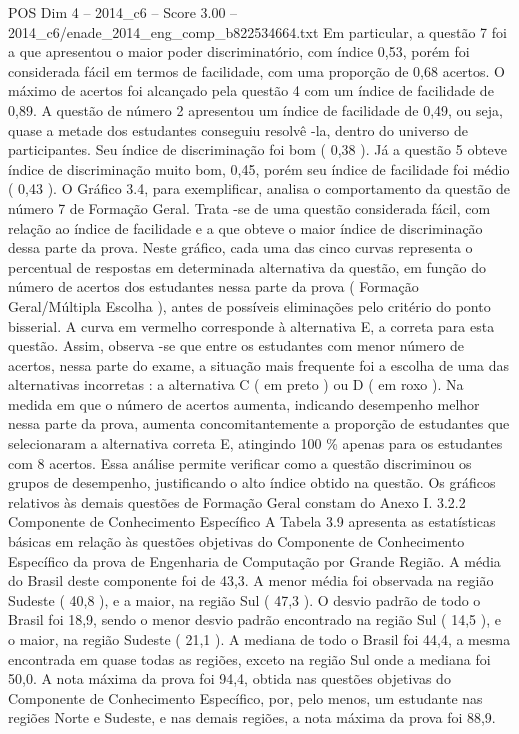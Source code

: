 \begin{textsample}{POS Dim 4 – 2014\_c6 – Score 3.00 – 2014\_c6/enade\_2014\_eng\_comp\_b822534664.txt}
Em particular, a questão 7 foi a que apresentou o maior poder discriminatório, com índice 0,53, porém foi considerada fácil em termos de facilidade, com uma proporção de 0,68 acertos.
O máximo de acertos foi alcançado pela questão 4 com um índice de facilidade de 0,89.
A questão de número 2 apresentou um índice de facilidade de 0,49, ou seja, quase a metade dos estudantes conseguiu resolvê -la, dentro do universo de participantes.
Seu índice de discriminação foi bom ( 0,38 ).
Já a questão 5 obteve índice de discriminação muito bom, 0,45, porém seu índice de facilidade foi médio ( 0,43 ).
O Gráfico 3.4, para exemplificar, analisa o comportamento da questão de número 7 de Formação Geral.
Trata -se de uma questão considerada fácil, com relação ao índice de facilidade e a que obteve o maior índice de discriminação dessa parte da prova.
Neste gráfico, cada uma das cinco curvas representa o percentual de respostas em determinada alternativa da questão, em função do número de acertos dos estudantes nessa parte da prova ( Formação Geral/Múltipla Escolha ), antes de possíveis eliminações pelo critério do ponto bisserial.
A curva em vermelho corresponde à alternativa E, a correta para esta questão.
Assim, observa -se que entre os estudantes com menor número de acertos, nessa parte do exame, a situação mais frequente foi a escolha de uma das alternativas incorretas : a alternativa C ( em preto ) ou D ( em roxo ).
Na medida em que o número de acertos aumenta, indicando desempenho melhor nessa parte da prova, aumenta concomitantemente a proporção de estudantes que selecionaram a alternativa correta E, atingindo 100 \% apenas para os estudantes com 8 acertos.
Essa análise permite verificar como a questão discriminou os grupos de desempenho, justificando o alto índice obtido na questão.
Os gráficos relativos às demais questões de Formação Geral constam do Anexo I. 3.2.2 Componente de Conhecimento Específico A Tabela 3.9 apresenta as estatísticas básicas em relação às questões objetivas do Componente de Conhecimento Específico da prova de Engenharia de Computação por Grande Região.
A média do Brasil deste componente foi de 43,3.
A menor média foi observada na região Sudeste ( 40,8 ), e a maior, na região Sul ( 47,3 ).
O desvio padrão de todo o Brasil foi 18,9, sendo o menor desvio padrão encontrado na região Sul ( 14,5 ), e o maior, na região Sudeste ( 21,1 ).
A mediana de todo o Brasil foi 44,4, a mesma encontrada em quase todas as regiões, exceto na região Sul onde a mediana foi 50,0.
A nota máxima da prova foi 94,4, obtida nas questões objetivas do Componente de Conhecimento Específico, por, pelo menos, um estudante nas regiões Norte e Sudeste, e nas demais regiões, a nota máxima da prova foi 88,9.

\end{textsample}
